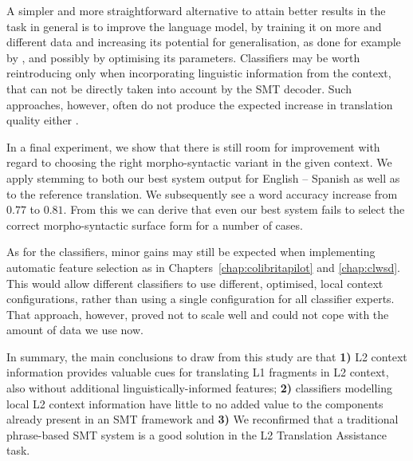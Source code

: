 A simpler and more straightforward alternative to attain better results in the
task in general is to improve the language model, by training it on more and
different data and increasing its potential for generalisation, as done for
example by \cite{UEDIN}, and possibly by optimising its parameters.
Classifiers may be worth reintroducing only when incorporating linguistic
information from the context, that can not be directly taken into account by
the SMT decoder. Such approaches, however, often do not produce the expected
increase in translation quality either \citep{UNAL, IUCL}.

In a final experiment, we show that there is still room for improvement
with regard to choosing the right morpho-syntactic variant in the given
context. We apply stemming to both our best system
output for English -- Spanish as well as to the reference translation. We
subsequently see a word accuracy increase from $0.77$ to $0.81$. From this we can derive that
even our best system fails to select the correct morpho-syntactic surface form for a
number of cases.

As for the classifiers, minor gains may still be expected when implementing
automatic feature selection  as in Chapters~\ref{chap:colibritapilot} and
\ref{chap:clwsd}. This would allow different classifiers to use different,
optimised, local context configurations, rather than using a single
configuration for all classifier experts. That approach, however, proved not to
scale well and could not cope with the amount of data we use now.

In summary, the main conclusions to draw from this study are that \textbf{1)}
L2 context information provides valuable cues for translating L1 fragments in
L2 context, also without additional linguistically-informed features;
\textbf{2)} classifiers modelling local L2 context information have little to
no added value to the components already present in an SMT framework and
\textbf{3)} We reconfirmed that a traditional phrase-based SMT system is a good
solution in the L2 Translation Assistance task.


